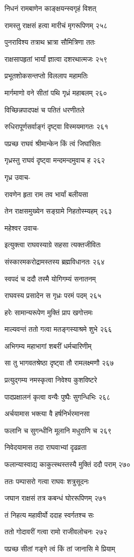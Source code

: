 निधनं रामबाणेन काङ्क्षयन्स्वगृहं विशत्

रामस्तु राक्षसं हत्वा मारीचं मृगरूपिणम् २५८

पुनराविश्य तत्राथ भ्रात्रा सौमित्रिणा ततः

राक्षसापहृतां भार्यां ज्ञात्वा दशरथात्मजः २५९

प्रभूतशोकसन्तप्तो विललाप महामतिः

मार्गमाणो वने सीतां पथि गृध्रं महाबलम् २६०

विच्छिन्नपादपक्षं च पतितं धरणीतले

रुधिरापूर्णसर्वाङ्गं दृष्ट्वा विस्मयमागतः २६१

पप्रच्छ राघवं श्रीमान्केन किं त्वं जिघांसितः

गृध्रस्तु राघवं दृष्ट्वा मन्दमन्दमुवाच ह २६२

गृध्र उवाच-

रावणेन हृता राम तव भार्यां बलीयसा

तेन राक्षसमुख्येन सङ्ग्रामे निहतोस्म्यहम् २६३

महेश्वर उवाच-

इत्युक्त्वा राघवस्याग्रे सहसा त्यक्तजीवितः

संस्कारमकरोद्रामस्तस्य ब्रह्मविधानतः २६४

स्वपदं च ददौ तस्मै योगिगम्यं सनातनम्

राघवस्य प्रसादेन स गृध्रः परमं पदम् २६५

हरेः सामान्यरूपेण मुक्तिं प्राप खगोत्तमः

माल्यवन्तं ततो गत्वा मतङ्गस्याश्रमे शुभे २६६

अभिगम्य महाभागां शबरीं धर्मचारिणीम्

सा तु भागवतश्रेष्ठा दृष्ट्वा तौ रामलक्ष्मणौ २६७

प्रत्युद्गम्य नमस्कृत्वा निवेश्य कुशविष्टरे

पादप्रक्षालनं कृत्वा वन्यैः पुष्पैः सुगन्धिभिः २६८

अर्चयामास भक्त्या वै हर्षनिर्भरमानसा

फलानि च सुगन्धीनि मूलानि मधुराणि च २६९

निवेदयामास तदा राघवाभ्यां दृढव्रता

फलान्यास्वाद्य काकुत्स्थस्तस्यै मुक्तिं ददौ पराम् २७०

ततः पम्पासरो गत्वा राघवः शत्रुसूदनः

जघान राक्षसं तत्र कबन्धं घोररूपिणम् २७१

तं निहत्य महावीर्यो ददाह स्वर्गतश्च सः

ततो गोदावरीं गत्वा रामो राजीवलोचनः २७२

पप्रच्छ सीतां गङ्गे त्वं किं तां जानासि मे प्रियाम्

